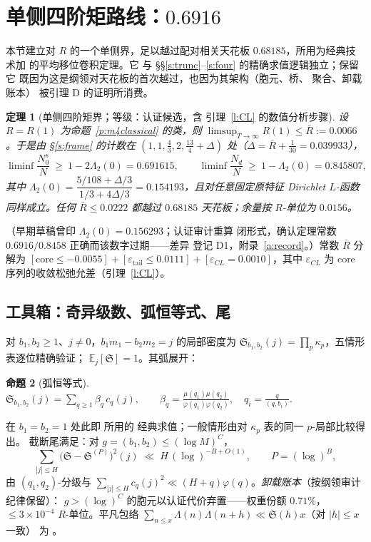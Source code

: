 \documentclass[11pt]{article}
\numberwithin{equation}{section}
\newtheorem{theorem}{定理}[section]
\newtheorem{proposition}[theorem]{命题}
\theoremstyle{definition}
\theoremstyle{remark}
\newcommand{\LL}{\Lambda}
\newcommand{\SSS}{\mathfrak{S}}
\begin{document}
\section{单侧四阶矩路线：$0.6916$}\label{s:fm}

本节建立对 $R$ 的一个单侧界，足以越过配对相关天花板
$0.68185$，所用为经典技术加 \cite{MRT} 的平均移位卷积定理。它
与 \S\S\ref{s:trunc}--\ref{s:four} 的精确求值逻辑独立；保留它
既因为这是纲领对天花板的首次越过，也因为其架构（胞元、桥、
聚合、卸载账本）
被引理 D 的证明所消费。

\begin{theorem}[单侧四阶矩界；等级：认证候选，含
引理~\ref{l:CL} 的数值分析步骤]\label{t:fm}
设 $R=R(1)$ 为命题~\ref{p:m4classical} 的类，则
$\limsup_{T\to\infty}R(1)\le\bar R:=0.0066$。于是由
\S\ref{s:frame} 的计数在
$(1,1,\tfrac43,2,\tfrac{13}4+\Delta)$ 处（$\Delta=\bar R+\tfrac1{30}
=0.039933$），
\[
\liminf\frac{N_0^{s}}{N}\ \ge\ 1-2\Lambda_2(0)=0.691615,
\qquad
\liminf\frac{N_d}{N}\ \ge\ 1-\Lambda_2(0)=0.845807,
\]
其中 $\Lambda_2(0)=\dfrac{5/108+\Delta/3}{1/3+4\Delta/3}
=0.154193$，且对任意固定原特征 Dirichlet $L$-函数同样成立。任何
$\bar R\le0.0222$ 都越过 $0.68185$ 天花板；余量按 $R$-单位为
$0.0156$。
\end{theorem}

\noindent（早期草稿曾印 $\Lambda_2(0)=0.156293$；认证审计重算
闭形式，确认定理常数 $0.6916/0.8458$ 正确而该数字过期——差异
登记 D1，附录~\ref{a:record}。）常数 $\bar R$ 分解为
$[\mathrm{core}\le-0.0055]+[\varepsilon_{\mathrm{tail}}\le0.0111]
+[\varepsilon_{CL}=0.0010]$，其中 $\varepsilon_{CL}$ 为 core
序列的收敛松弛允差（引理~\ref{l:CL}）。

\subsection{工具箱：奇异级数、弧恒等式、尾}\label{s:fm:toolkit}

对 $b_1,b_2\ge1$、$j\ne0$，$b_1m_1-b_2m_2=j$ 的局部密度为
$\SSS_{b_1,b_2}(j)=\prod_p\kappa_p$，五情形表逐位精确验证；
$\mathbb E_j[\SSS]=1$。其弧展开：

\begin{proposition}[弧恒等式]\label{p:S}
$\displaystyle
\SSS_{b_1,b_2}(j)=\sum_{q\ge1}\beta_q\,c_q(j),\qquad
\beta_q=\frac{\mu(q_1)\mu(q_2)}{\varphi(q_1)\varphi(q_2)},\quad
q_i=\frac{q}{(q,b_i)}.$
\end{proposition}

\noindent 在 $b_1=b_2=1$ 处此即 \cite[(66)--(67)]{MRT} 所用的
经典求值；一般情形由对 $\kappa_p$ 表的同一 $p$-局部比较得出。
截断尾满足：对 $g=(b_1,b_2)\le(\log M)^{C}$，
\begin{equation}\label{e:X2}
\textstyle\sum_{|j|\le H}\bigl(\SSS-\SSS^{(P)}\bigr)^2(j)\;\ll\;
H\,(\log)^{-B+O(1)},\qquad P=(\log)^{B},
\end{equation}
由 $(q_1,q_2)$-分级与 $\sum_{|j|\le H}c_q(j)^2\ll(H+q)
\varphi(q)$。\emph{卸载账本}（按纲领审计纪律保留）：
$g>(\log)^{C}$ 的胞元以认证代价弃置——权重份额 $0.71\%$，
$\le3\times10^{-4}$ $R$-单位。平凡包络
$\sum_{n\le x}\LL(n)\LL(n+h)\ll\SSS(h)x$（对 $|h|\le x$ 一致）
为 \cite[推论~3.14]{HR}。
\end{document}

